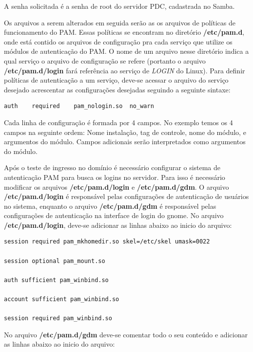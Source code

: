 A senha solicitada é a senha de root do servidor PDC, cadastrada no Samba.

Os arquivos a serem alterados em seguida serão as os arquivos de políticas de funcionamento do PAM. Essas políticas se encontram no diretório \textbf{/etc/pam.d}, onde está contido os arquivos de configuração pra cada serviço que utilize os módulos de autenticação do PAM. O nome de um arquivo nesse diretório indica a qual serviço o arquivo de configuração se refere (portanto o arquivo \textbf{/etc/pam.d/login} fará referência ao serviço de \textit{LOGIN} do Linux).
Para definir políticas de autenticação a um serviço, deve-se acessar o arquivo do serviço desejado acrescentar as configurações desejadas seguindo a seguinte sintaxe:\\

\begin{lstlisting}	
auth	required	pam_nologin.so	no_warn
\end{lstlisting}

Cada linha de configuração é formada por 4 campos. No exemplo temos os 4 campos na seguinte ordem: Nome instalação, tag de controle, nome do módulo, e argumentos do módulo. Campos adicionais serão interpretados como argumentos do módulo.

Após o teste de ingresso no domínio é necessário configurar o sistema de autenticação PAM para busca os logins no servidor. Para isso é necessário modificar os arquivos \textbf{/etc/pam.d/login} e \textbf{/etc/pam.d/gdm}. O arquivo \textbf{/etc/pam.d/login} é responsável pelas configurações de autenticação de usuários no sistema, enquanto o arquivo \textbf{/etc/pam.d/gdm} é responsável pelas configurações de autenticação na interface de login do gnome.
No arquivo \textbf{/etc/pam.d/login}, deve-se adicionar as linhas abaixo ao inicio do arquivo:\\

\begin{lstlisting}
session required pam_mkhomedir.so skel=/etc/skel umask=0022

session optional pam_mount.so

auth sufficient pam_winbind.so

account sufficient pam_winbind.so

session required pam_winbind.so
\end{lstlisting}

No arquivo \textbf{/etc/pam.d/gdm} deve-se comentar todo o seu conteúdo e adicionar as linhas abaixo ao inicio do arquivo:\\

